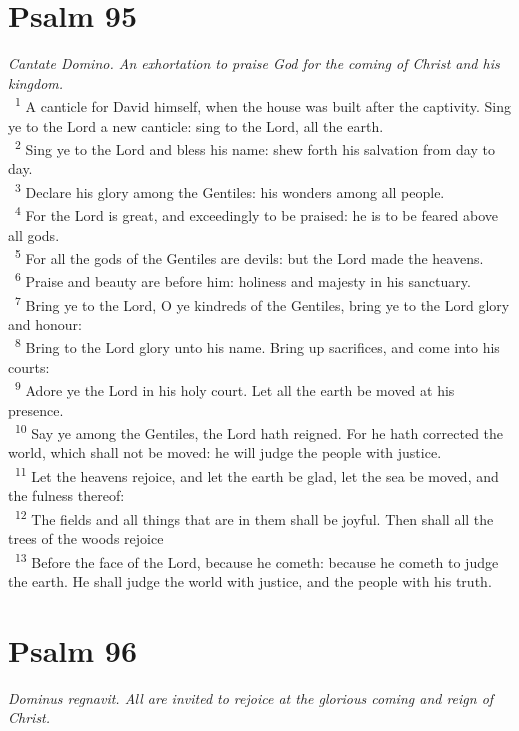 \documentclass[a5paper,12pt]{article}
\begin{document}
\begin{multicols*}{2}
\section{Psalm 95}
\label{sec:org759030b}
\emph{Cantate Domino. An exhortation to praise God for the coming of Christ and his kingdom.}\\

~\textsuperscript{1} A canticle for David himself, when the house was built after the captivity. Sing ye to the Lord a new canticle: sing to the Lord, all the earth.\\
~\textsuperscript{2} Sing ye to the Lord and bless his name: shew forth his salvation from day to day.\\
~\textsuperscript{3} Declare his glory among the Gentiles: his wonders among all people.\\
~\textsuperscript{4} For the Lord is great, and exceedingly to be praised: he is to be feared above all gods.\\
~\textsuperscript{5} For all the gods of the Gentiles are devils: but the Lord made the heavens.\\
~\textsuperscript{6} Praise and beauty are before him: holiness and majesty in his sanctuary.\\
~\textsuperscript{7} Bring ye to the Lord, O ye kindreds of the Gentiles, bring ye to the Lord glory and honour:\\
~\textsuperscript{8} Bring to the Lord glory unto his name. Bring up sacrifices, and come into his courts:\\
~\textsuperscript{9} Adore ye the Lord in his holy court. Let all the earth be moved at his presence.\\
~\textsuperscript{10} Say ye among the Gentiles, the Lord hath reigned. For he hath corrected the world, which shall not be moved: he will judge the people with justice.\\
~\textsuperscript{11} Let the heavens rejoice, and let the earth be glad, let the sea be moved, and the fulness thereof:\\
~\textsuperscript{12} The fields and all things that are in them shall be joyful. Then shall all the trees of the woods rejoice\\
~\textsuperscript{13} Before the face of the Lord, because he cometh: because he cometh to judge the earth. He shall judge the world with justice, and the people with his truth.\\

\section{Psalm 96}
\label{sec:orge697148}
\emph{Dominus regnavit. All are invited to rejoice at the glorious coming and reign of Christ.}\\


\end{multicols*}
\end{document}
